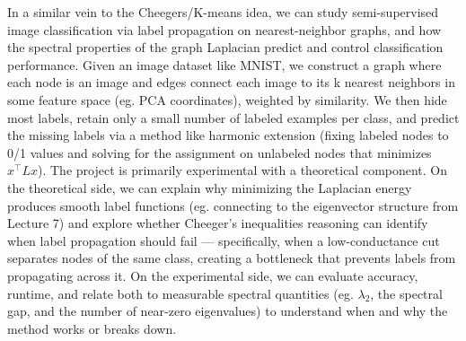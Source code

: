 \documentclass{article}
\begin{document}
In a similar vein to the Cheegers/K-means idea, we can study semi-supervised image classification via label propagation on nearest-neighbor graphs, and how the spectral properties of the graph Laplacian predict and control classification performance. Given an image dataset like MNIST, we construct a graph where each node is an image and edges connect each image to its k nearest neighbors in some feature space (eg. PCA coordinates), weighted by similarity. We then hide most labels, retain only a small number of labeled examples per class, and predict the missing labels via a method like harmonic extension (fixing labeled nodes to 0/1 values and solving for the assignment on unlabeled nodes that minimizes $x^\top Lx$). The project is primarily experimental with a theoretical component. On the theoretical side, we can explain why minimizing the Laplacian energy produces smooth label functions (eg. connecting to the eigenvector structure from Lecture 7) and explore whether Cheeger's inequalities reasoning can identify when label propagation should fail — specifically, when a low-conductance cut separates nodes of the same class, creating a bottleneck that prevents labels from propagating across it. On the experimental side, we can evaluate accuracy, runtime, and relate both to measurable spectral quantities (eg. $\lambda_2$, the spectral gap, and the number of near-zero eigenvalues) to understand when and why the method works or breaks down.
\end{document}
